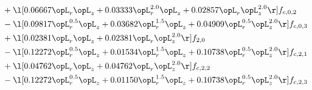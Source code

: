 \begin{alignat}{2}
& + \l[  0.06667 \opL_r \opL_z +  0.03333 \opL_r^{2.0} \opL_z +  0.02857 \opL_r \opL_z^{2.0}  \r] f_{c,0,2} \nonumber \\ 
& - \l[  0.09817 \opL_r^{0.5} \opL_z +  0.03682 \opL_r^{1.5} \opL_z +  0.04909 \opL_r^{0.5} \opL_z^{2.0}  \r] f_{c,0,3} \nonumber \\ 
& + \l[  0.02381 \opL_r \opL_z +  0.02381 \opL_r \opL_z^{2.0}  \r] f_{2,0} \nonumber \\ 
& - \l[  0.12272 \opL_r^{0.5} \opL_z +  0.01534 \opL_r^{1.5} \opL_z +  0.10738 \opL_r^{0.5} \opL_z^{2.0}  \r] f_{c,2,1} \nonumber \\ 
& + \l[  0.04762 \opL_r \opL_z +  0.04762 \opL_r \opL_z^{2.0}  \r] f_{c,2,2} \nonumber \\ 
& - \l[  0.12272 \opL_r^{0.5} \opL_z +  0.01150 \opL_r^{1.5} \opL_z +  0.10738 \opL_r^{0.5} \opL_z^{2.0}  \r] f_{c,2,3} \nonumber \\ 
\end{alignat} 


